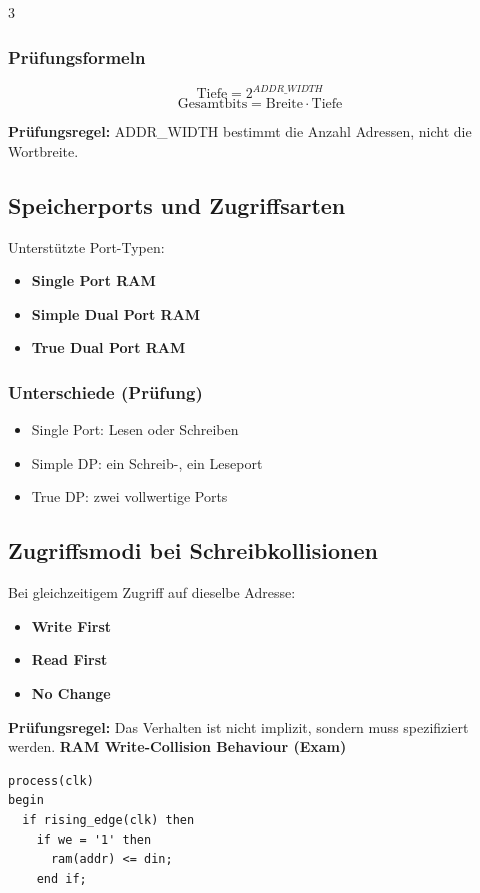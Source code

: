 \documentclass[10pt,a4paper]{article}
\newcommand{\hilite}[1]{\colorbox{yellow!25}{#1}}
\newcommand{\imp}[1]{\textbf{\textcolor{codeemph}{#1}}}
\begin{document}
\begin{multicols}{3}
\subsubsection*{\textcolor{codeemph}{Prüfungsformeln}}
\[
\text{Tiefe} = 2^{ADDR\_WIDTH}
\]
\[
\text{Gesamtbits} = \text{Breite} \cdot \text{Tiefe}
\]

\imp{Prüfungsregel:}  
\hilite{ADDR}\_\hilite{WIDTH} \hilite{bestimmt} die Anzahl Adressen, nicht die Wortbreite.

\subsection{Speicherports und Zugriffsarten}
Unterstützte Port-Typen:
\begin{itemize}
  \item \textbf{Single Port RAM}
  \item \textbf{Simple Dual Port RAM}
  \item \textbf{True Dual Port RAM}
\end{itemize}

\subsubsection*{\textcolor{codeemph}{Unterschiede (Prüfung)}}
\begin{itemize}
  \item Single Port: Lesen oder Schreiben
  \item Simple DP: ein Schreib-, ein Leseport
  \item True DP: zwei vollwertige Ports
\end{itemize}

\subsection{Zugriffsmodi bei Schreibkollisionen}
Bei gleichzeitigem Zugriff auf dieselbe Adresse:
\begin{itemize}
  \item \textbf{Write First}
  \item \textbf{Read First}
  \item \textbf{No Change}
\end{itemize}

\imp{Prüfungsregel:}  
Das \hilite{Verhalten} ist nicht \hilite{implizit}, \hilite{sondern} muss spezifiziert werden.
\textbf{RAM Write-Collision Behaviour (Exam)}
\begin{lstlisting}
process(clk)
begin
  if rising_edge(clk) then
    if we = '1' then
      ram(addr) <= din;
    end if;


\end{lstlisting}
\end{multicols}
\end{document}
